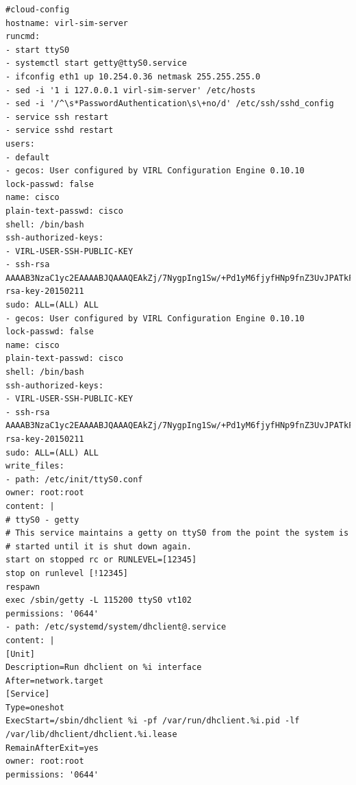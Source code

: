 \documentclass[11pt]{report}
\begin{document}
\begin{appendices}
\begin{lstlisting}
#cloud-config
hostname: virl-sim-server
runcmd:
- start ttyS0
- systemctl start getty@ttyS0.service
- ifconfig eth1 up 10.254.0.36 netmask 255.255.255.0
- sed -i '1 i 127.0.0.1 virl-sim-server' /etc/hosts
- sed -i '/^\s*PasswordAuthentication\s\+no/d' /etc/ssh/sshd_config
- service ssh restart
- service sshd restart
users:
- default
- gecos: User configured by VIRL Configuration Engine 0.10.10
lock-passwd: false
name: cisco
plain-text-passwd: cisco
shell: /bin/bash
ssh-authorized-keys:
- VIRL-USER-SSH-PUBLIC-KEY
- ssh-rsa AAAAB3NzaC1yc2EAAAABJQAAAQEAkZj/7NygpIng1Sw/+Pd1yM6fjyfHNp9fnZ3UvJPATkFrm8+w5TynYuz/uNk4G0pR/ffT9SLMbvUXKbyJQqlsTCx9PwwFB92AY6BZTOfa9Zy/J4F19tCBMoIaGf7YmJVFLSTkiSrmxPMqlWsDD6rx3b70MLihkCDcvmzHTeDNT2WGkwTjqfUJyZ7PMvgwhU80QmB3z3H/JikWWDZWUQiT7kf/7nSCG1MOWILm6Gj1Grxe4ek0+PzO8zyLhKr1TYIqoawO0HiMVb13NTBOJIMQ0T0T8uh1wphjXPdLzPXQ25iUs1sRF+9R8ZPg3CT46Wx//YmxdwodHTxW7bShq1sKJw==
rsa-key-20150211
sudo: ALL=(ALL) ALL
- gecos: User configured by VIRL Configuration Engine 0.10.10
lock-passwd: false
name: cisco
plain-text-passwd: cisco
shell: /bin/bash
ssh-authorized-keys:
- VIRL-USER-SSH-PUBLIC-KEY
- ssh-rsa AAAAB3NzaC1yc2EAAAABJQAAAQEAkZj/7NygpIng1Sw/+Pd1yM6fjyfHNp9fnZ3UvJPATkFrm8+w5TynYuz/uNk4G0pR/ffT9SLMbvUXKbyJQqlsTCx9PwwFB92AY6BZTOfa9Zy/J4F19tCBMoIaGf7YmJVFLSTkiSrmxPMqlWsDD6rx3b70MLihkCDcvmzHTeDNT2WGkwTjqfUJyZ7PMvgwhU80QmB3z3H/JikWWDZWUQiT7kf/7nSCG1MOWILm6Gj1Grxe4ek0+PzO8zyLhKr1TYIqoawO0HiMVb13NTBOJIMQ0T0T8uh1wphjXPdLzPXQ25iUs1sRF+9R8ZPg3CT46Wx//YmxdwodHTxW7bShq1sKJw==
rsa-key-20150211
sudo: ALL=(ALL) ALL
write_files:
- path: /etc/init/ttyS0.conf
owner: root:root
content: |
# ttyS0 - getty
# This service maintains a getty on ttyS0 from the point the system is
# started until it is shut down again.
start on stopped rc or RUNLEVEL=[12345]
stop on runlevel [!12345]
respawn
exec /sbin/getty -L 115200 ttyS0 vt102
permissions: '0644'
- path: /etc/systemd/system/dhclient@.service
content: |
[Unit]
Description=Run dhclient on %i interface
After=network.target
[Service]
Type=oneshot
ExecStart=/sbin/dhclient %i -pf /var/run/dhclient.%i.pid -lf /var/lib/dhclient/dhclient.%i.lease
RemainAfterExit=yes
owner: root:root
permissions: '0644'

\end{lstlisting}


\end{appendices}
\end{document}
